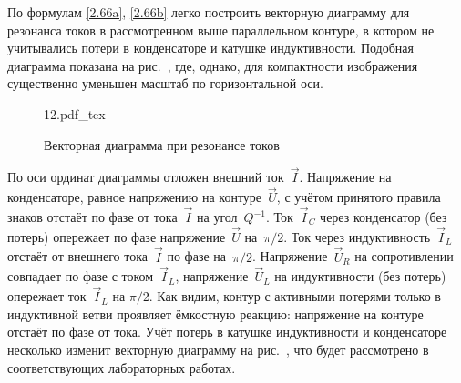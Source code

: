 \documentclass[a4paper,oneside]{book}
\begin{document}
По формулам \eqref{2.66a}, \eqref{2.66b} легко построить векторную диаграмму для резонанса токов в рассмотренном выше параллельном контуре, в котором не учитывались потери в конденсаторе и катушке индуктивности. Подобная диаграмма показана на рис.~, где, однако, для компактности изображения существенно уменьшен масштаб по горизонтальной оси.

\begin{figure}[h!]
	\centering
	{12.pdf_tex}
	\caption{Векторная диаграмма при резонансе токов}
\end{figure}
По оси ординат диаграммы отложен внешний ток~$\vec I$. Напряжение на конденсаторе, равное
напряжению на контуре~$\vec U$, с учётом принятого правила знаков отстаёт по
фазе от тока~$\vec I$ на угол~$Q^{-1}$. Ток~$\vec I_C$ через конденсатор (без
потерь) опережает по фазе напряжение~$\vec U$ на~$\pi/2$. Ток через
индуктивность~$\vec I_L$ отстаёт от внешнего тока~$\vec I$ по фазе на~$\pi/2$.
Напряжение~$\vec U_R$ на сопротивлении совпадает по фазе с током~$\vec I_L$,
напряжение~$\vec U_L$ на индуктивности (без потерь) опережает ток~$\vec I_L$ на
$\pi/2$. Как видим, контур с активными потерями только в индуктивной ветви
проявляет ёмкостную реакцию: напряжение на контуре отстаёт по фазе от тока. Учёт
потерь в катушке индуктивности и конденсаторе несколько изменит векторную
диаграмму на рис.~, что будет рассмотрено в соответствующих
лабораторных работах.
\end{document}
